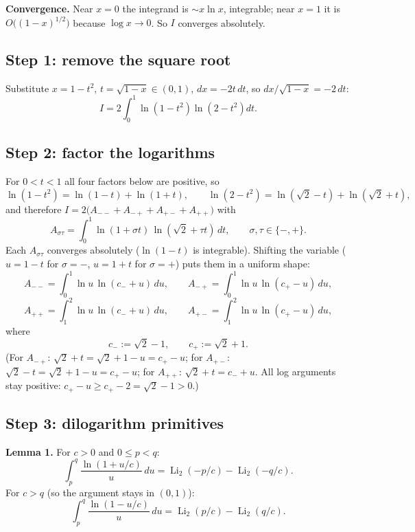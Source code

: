 \documentclass[11pt]{article}
\theoremstyle{remark}
\begin{document}
\textbf{Convergence.} Near $x=0$ the integrand is $\sim x\ln x$, integrable; near $x=1$ it is $O\!\big((1-x)^{1/2}\big)$ because $\log x\to 0$. So $I$ converges absolutely.

\subsection*{Step 1: remove the square root}

Substitute $x=1-t^2$, $t=\sqrt{1-x}\in(0,1)$, $dx=-2t\,dt$, so $dx/\sqrt{1-x}=-2\,dt$:
$$I=2\int_0^1 \ln\!\left(1-t^{2}\right)\ln\!\left(2-t^{2}\right)dt .$$

\subsection*{Step 2: factor the logarithms}

For $0<t<1$ all four factors below are positive, so
$$\ln(1-t^2)=\ln(1-t)+\ln(1+t),\qquad \ln(2-t^2)=\ln(\sqrt2-t)+\ln(\sqrt2+t),$$
and therefore $I=2\big(A_{--}+A_{-+}+A_{+-}+A_{++}\big)$ with
$$A_{\sigma\tau}=\int_0^1 \ln(1+\sigma t)\,\ln(\sqrt2+\tau t)\,dt,\qquad \sigma,\tau\in\{-,+\}.$$
Each $A_{\sigma\tau}$ converges absolutely ($\ln(1-t)$ is integrable). Shifting the variable ($u=1-t$ for $\sigma=-$, $u=1+t$ for $\sigma=+$) puts them in a uniform shape:
$$A_{--}=\int_0^1 \ln u\,\ln(c_-+u)\,du,\qquad A_{-+}=\int_0^1 \ln u\,\ln(c_+-u)\,du,$$
$$A_{++}=\int_1^2 \ln u\,\ln(c_-+u)\,du,\qquad A_{+-}=\int_1^2 \ln u\,\ln(c_+-u)\,du,$$
where
$$c_-:=\sqrt2-1,\qquad c_+:=\sqrt2+1 .$$
(For $A_{-+}$: $\sqrt2+t=\sqrt2+1-u=c_+-u$; for $A_{+-}$: $\sqrt2-t=\sqrt2+1-u=c_+-u$; for $A_{++}$: $\sqrt2+t=c_-+u$. All log arguments stay positive: $c_+-u\ge c_+-2=\sqrt2-1>0$.)

\subsection*{Step 3: dilogarithm primitives}

\textbf{Lemma 1.} For $c>0$ and $0\le p<q$:
\begin{equation*}\int_p^q\frac{\ln(1+u/c)}{u}\,du=\operatorname{Li}_2(-p/c)-\operatorname{Li}_2(-q/c). \tag{L1a}\end{equation*}
For $c>q$ (so the argument stays in $(0,1)$):
\begin{equation*}\int_p^q\frac{\ln(1-u/c)}{u}\,du=\operatorname{Li}_2(p/c)-\operatorname{Li}_2(q/c). \tag{L1b}\end{equation*}
\end{document}
